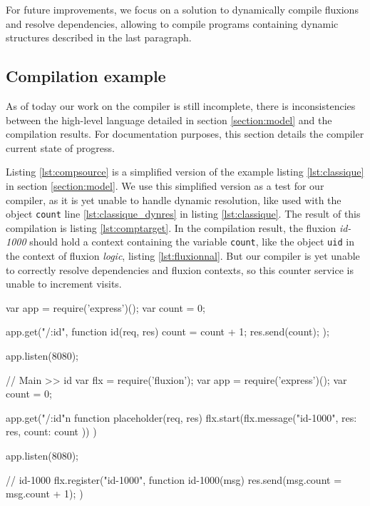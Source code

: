 For future improvements, we focus on a solution to dynamically compile fluxions and resolve dependencies, allowing to compile programs containing dynamic structures described in the last paragraph.

\subsection{Compilation example}

As of today our work on the compiler is still incomplete, there is inconsistencies between the high-level language detailed in section \ref{section:model} and the compilation results.
For documentation purposes, this section details the compiler current state of progress.

Listing \ref{lst:compsource} is a simplified version of the example listing \ref{lst:classique} in section \ref{section:model}.
We use this simplified version as a test for our compiler, as it is yet unable to handle dynamic resolution, like used with the object \texttt{count} line \ref{lst:classique_dynres} in listing \ref{lst:classique}.
The result of this compilation is listing \ref{lst:comptarget}.
In the compilation result, the fluxion \textit{id-1000} should hold a context containing the variable \texttt{count}, like the object \texttt{uid} in the context of fluxion \textit{logic}, listing \ref{lst:fluxionnal}.
But our compiler is yet unable to correctly resolve dependencies and fluxion contexts, so this counter service is unable to increment visits.

\begin{code}[Javascript, caption={Simplified version of the initial service},label={lst:compsource}]
var app = require('express')();
var count = 0;

app.get("/:id", function id(req, res){
  count = count + 1;
  res.send(count);
});

app.listen(8080);
\end{code}

\begin{code}[Javascript, caption={Compilation result of code listing \ref{lst:compsource}},label={lst:comptarget}]
// Main >> id
  var flx = require('fluxion');
  var app = require('express')();
  var count = 0;
 
  app.get("/:id"n function placeholder(req, res) {
    flx.start(flx.message("id-1000", {
      res: res,
      count: count
    }))
  })
 
  app.listen(8080);

// id-1000
  flx.register("id-1000", function id-1000(msg){
    res.send(msg.count = msg.count + 1);
  })
\end{code}





